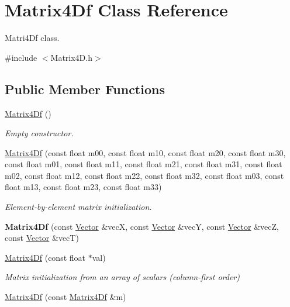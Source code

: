 \hypertarget{class_matrix4_df}{
\section{\-Matrix4\-Df \-Class \-Reference}
\label{class_matrix4_df}
}


\-Matri4\-Df class.  




{\ttfamily \#include $<$\-Matrix4\-D.\-h$>$}

\subsection*{\-Public \-Member \-Functions}
\begin{DoxyCompactItemize}
\item 
\hyperlink{class_matrix4_df_a2fe54703eee28a4223a28eefa68296d7}{\-Matrix4\-Df} ()
\begin{DoxyCompactList}\small\item\em \-Empty constructor. \end{DoxyCompactList}\item 
\hyperlink{class_matrix4_df_a2c3d926646349c153b1e8e7fd5735b09}{\-Matrix4\-Df} (const float m00, const float m10, const float m20, const float m30, const float m01, const float m11, const float m21, const float m31, const float m02, const float m12, const float m22, const float m32, const float m03, const float m13, const float m23, const float m33)
\begin{DoxyCompactList}\small\item\em \-Element-\/by-\/element matrix initialization. \end{DoxyCompactList}\item 
\hypertarget{class_matrix4_df_a7ccf1f4d0904efdc8e532c5f9e2486d8}{
{\bfseries \-Matrix4\-Df} (const \hyperlink{class_vector}{\-Vector} \&vec\-X, const \hyperlink{class_vector}{\-Vector} \&vec\-Y, const \hyperlink{class_vector}{\-Vector} \&vec\-Z, const \hyperlink{class_vector}{\-Vector} \&vec\-T)}
\label{class_matrix4_df_a7ccf1f4d0904efdc8e532c5f9e2486d8}

\item 
\hypertarget{class_matrix4_df_a0634ea4d8f7312adaa5f780d42b8d5e3}{
\hyperlink{class_matrix4_df_a0634ea4d8f7312adaa5f780d42b8d5e3}{\-Matrix4\-Df} (const float $\ast$val)}
\label{class_matrix4_df_a0634ea4d8f7312adaa5f780d42b8d5e3}

\begin{DoxyCompactList}\small\item\em \-Matrix initialization from an array of scalars (column-\/first order) \end{DoxyCompactList}\item 
\hypertarget{class_matrix4_df_a14ce89423a261129333c5bd1f0ff6644}{
\hyperlink{class_matrix4_df_a14ce89423a261129333c5bd1f0ff6644}{\-Matrix4\-Df} (const \hyperlink{class_matrix4_df}{\-Matrix4\-Df} \&m)}
\label{class_matrix4_df_a14ce89423a261129333c5bd1f0ff6644}


\end{DoxyCompactItemize}
